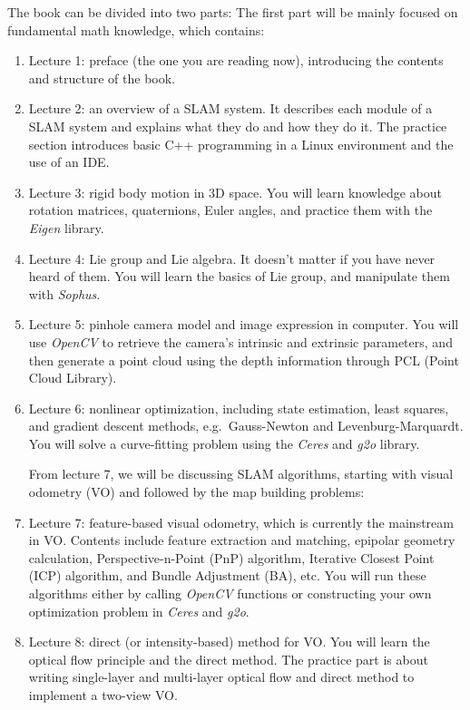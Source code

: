 The book can be divided into two parts: The first part will be mainly focused on fundamental math knowledge, which contains:
\begin{enumerate}
	\item Lecture 1: preface (the one you are reading now), introducing the contents and structure of the book.
	\item Lecture 2: an overview of a SLAM system. It describes each module of a SLAM system and explains what they do and how they do it. The practice section introduces basic C++ programming in a Linux environment and the use of an IDE\@.
	\item Lecture 3: rigid body motion in 3D space. You will learn knowledge about rotation matrices, quaternions, Euler angles, and practice them with the \textit{Eigen} library.
	\item Lecture 4: Lie group and Lie algebra. It doesn't matter if you have never heard of them. You will learn the basics of Lie group, and manipulate them with \textit{Sophus}.
	\item Lecture 5: pinhole camera model and image expression in computer. You will use \textit{OpenCV} to retrieve the camera's intrinsic and extrinsic parameters, and then generate a point cloud using the depth information through PCL (Point Cloud Library).
	\item Lecture 6: nonlinear optimization, including state estimation, least squares, and gradient descent methods, e.g.\ Gauss-Newton and Levenburg-Marquardt. You will solve a curve-fitting problem using the \textit{Ceres} and \textit{g2o} library.

	From lecture 7, we will be discussing SLAM algorithms, starting with visual odometry (VO) and followed by the map building problems: 
	
	\item Lecture 7: feature-based visual odometry, which is currently the mainstream in VO. Contents include feature extraction and matching, epipolar geometry calculation, Perspective-n-Point (PnP) algorithm, Iterative Closest Point (ICP) algorithm, and Bundle Adjustment (BA), etc. You will run these algorithms either by calling \textit{OpenCV} functions or constructing your own optimization problem in \textit{Ceres} and \textit{g2o}.
	
	\item Lecture 8: direct (or intensity-based) method for VO. You will learn the optical flow principle and the direct method. The practice part is about writing single-layer and multi-layer optical flow and direct method to implement a two-view VO.
	

\end{enumerate}
